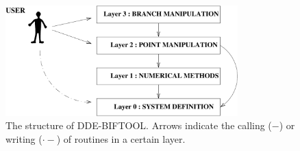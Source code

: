 \documentclass[10pt]{scrartcl}
\newcommand{\DDEBIFCODE}{\textsc{DDE-BIFTOOL}}
\begin{document}

\begin{figure}[t]
\begin{center}
\includegraphics[width=0.8\textwidth]{fig/code_struct}
\end{center}
\caption{\label{struct_pic}
The structure of {\DDEBIFCODE}. Arrows indicate the 
calling ($-$) or writing ($\cdot-$) of routines in a certain layer.} 
\end{figure}

% 
% 
\end{document}
